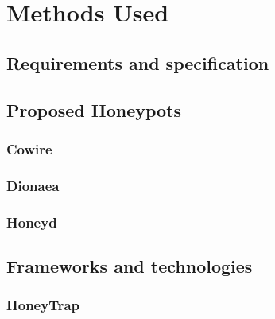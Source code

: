 \chapter{Methods Used}

\section{Requirements and specification}

\section{Proposed Honeypots}

\subsection{Cowire}

\subsection{Dionaea}

\subsection{Honeyd}


\section{Frameworks and technologies}

\subsection{HoneyTrap}
